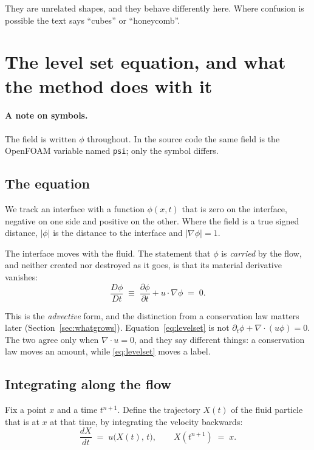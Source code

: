 \documentclass[11pt,a4paper]{article}
\begin{document}
They are unrelated shapes, and they behave differently here. Where confusion is possible the
text says ``cubes'' or ``honeycomb''.


\section{The level set equation, and what the method does with it}

\paragraph{A note on symbols.} The field is written \(\phi\) throughout. In the source code
the same field is the OpenFOAM variable named \texttt{psi}; only the symbol differs.

\subsection{The equation}

We track an interface with a function \(\phi(x,t)\) that is zero on the interface, negative on
one side and positive on the other. Where the field is a true signed distance, \(|\phi|\) is the
distance to the interface and \(|\nabla\phi| = 1\).

The interface moves with the fluid. The statement that \(\phi\) is \emph{carried} by the flow,
and neither created nor destroyed as it goes, is that its material derivative vanishes:
\begin{equation}
  \frac{D\phi}{Dt} \;\equiv\; \frac{\partial \phi}{\partial t} + u\cdot\nabla\phi \;=\; 0 .
  \label{eq:levelset}
\end{equation}

This is the \emph{advective} form, and the distinction from a conservation law matters later
(Section~\ref{sec:whatgrows}). Equation~\eqref{eq:levelset} is not
\(\partial_t\phi + \nabla\cdot(u\phi) = 0\). The two agree only when \(\nabla\cdot u = 0\), and
they say different things: a conservation law moves an amount, while \eqref{eq:levelset} moves a
label.

\subsection{Integrating along the flow}

Fix a point \(x\) and a time \(t^{n+1}\). Define the trajectory \(X(t)\) of the fluid particle
that is at \(x\) at that time, by integrating the velocity backwards:
\begin{equation}
  \frac{dX}{dt} \;=\; u\bigl(X(t),\,t\bigr), \qquad X(t^{n+1}) \;=\; x .
  \label{eq:traj}
\end{equation}
\end{document}
